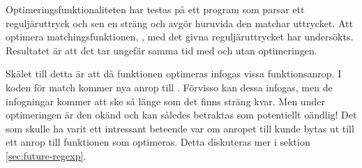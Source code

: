 \documentclass[Rapport]{subfiles}
\begin{document}
Optimeringsfunktionaliteten har testas på ett program som parsar ett reguljäruttryck
och sen en sträng och avgör huruvida den matchar uttrycket. Att optimera 
matchingsfunktionen, , med det givna
reguljäruttrycket har undersökts. Resultatet är att det tar ungefär samma
tid med och utan optimeringen. 

Skälet till detta är att då funktionen  optimeras infogas
vissa funktionsanrop. I koden för match kommer nya anrop till .
Förvisso kan dessa infogas, men de infogningar kommer att ske så länge som det
finns sträng kvar. Men under optimeringen är den okänd och kan således betraktas
som potentiellt oändlig! Det som skulle ha varit ett intressant beteende var
om anropet till  kunde bytas ut till ett anrop till funktionen
som optimeras. Detta diskuteras mer i sektion
\ref{sec:future-regexp}.

\end{document}

